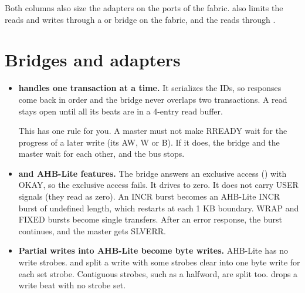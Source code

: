 Both columns also size the adapters on the ports of the fabric.  also
limits the reads and writes through a  or  bridge on
the fabric, and the reads through .

\section{Bridges and adapters}

\begin{itemize}
\item \textbf{ handles one transaction at a time.} It serializes the
  IDs, so responses come back in order and the bridge never overlaps two transactions.
  A read stays open until all its beats are in a 4-entry read buffer.

  This has one rule for you. A master must not make RREADY wait for the progress of a
  later write (its AW, W or B). If it does, the bridge and the master wait for each other,
  and the bus stops.
\item \textbf{ and AHB-Lite features.} The bridge answers an exclusive
  access () with OKAY, so the exclusive access fails. It drives
   to zero. It does not carry USER signals (they read as zero). An INCR
  burst becomes an AHB-Lite INCR burst of undefined length, which restarts at each 1 KB
  boundary. WRAP and FIXED bursts become single transfers. After an error response, the
  burst continues, and the master gets SLVERR.
\item \textbf{Partial writes into AHB-Lite become byte writes.} AHB-Lite has no write
  strobes.  and  split a write with some strobes
  clear into one byte write for each set strobe. Contiguous strobes, such as a halfword,
  are split too.  drops a write beat with no strobe set.


\end{itemize}
